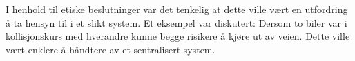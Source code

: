 I henhold til etiske beslutninger var det tenkelig at dette ville vært en utfordring å ta hensyn til i et slikt system. Et eksempel var diskutert: Dersom to biler var i kollisjonskurs med hverandre kunne begge risikere å kjøre ut av veien. Dette ville vært enklere å håndtere av et sentralisert system.
